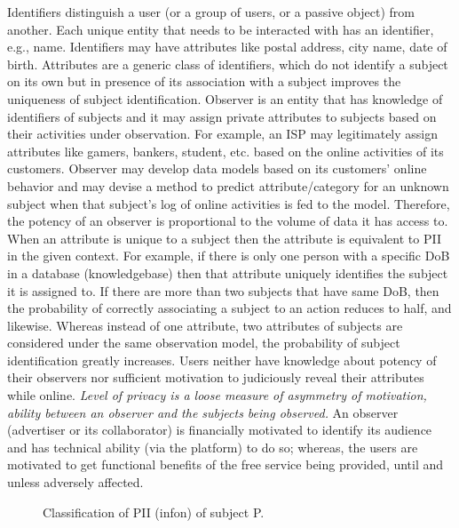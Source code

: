 \documentclass[runningheads]{llncs}
\begin{document}
Identifiers distinguish a user (or a group of users, or a passive
object) from another. Each unique entity that needs to be interacted
with has an identifier, e.g., name. Identifiers may have attributes
like postal address, city name, date of birth. Attributes are a
generic class of identifiers, which do not identify a subject on its
own but in presence of its association with a subject improves the
uniqueness of subject identification. Observer is an entity that has
knowledge of identifiers of subjects and it may assign private
attributes to subjects based on their activities under
observation. For example, an ISP may legitimately assign attributes
like gamers, bankers, student, etc. based on the online activities of
its customers. Observer may develop data models based on its
customers' online behavior and may devise a method to predict
attribute/category for an unknown subject when that subject's log of
online activities is fed to the model. Therefore, the potency of an
observer is proportional to the volume of data it has access to. When
an attribute is unique to a subject then the attribute is equivalent
to PII in the given context. For example, if there is only one person
with a specific DoB in a database (knowledgebase) then that attribute
uniquely identifies the subject it is assigned to. If there are more
than two subjects that have same DoB, then the probability of
correctly associating a subject to an action reduces to half, and
likewise. Whereas instead of one attribute, two attributes of subjects
are considered under the same observation model, the probability of
subject identification greatly increases. Users neither have knowledge
about potency of their observers nor sufficient motivation to
judiciously reveal their attributes while online. \textit{Level of
  privacy is a loose measure of asymmetry of motivation, ability
  between an observer and the subjects being observed.} An observer
(advertiser or its collaborator) is financially motivated to identify
its audience and has technical ability (via the platform) to do so;
whereas, the users are motivated to get functional benefits of the
free service being provided, until and unless adversely affected.
\begin{figure}[!htp]
  \centering
  {}
  \caption{Classification of PII (infon) of subject P.}
  \label{fig:personal-info-classification}
\end{figure}
\end{document}
